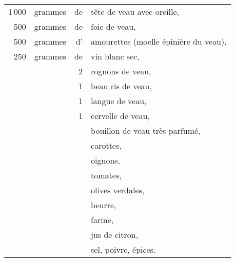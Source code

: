 \footnotesize
\begin{longtable}{rrrp{18em}}
  1 000 & grammes & de & tête de veau avec oreille,                                                       \\
    500 & grammes & de & foie de veau,                                                                    \\
    500 & grammes & d’ & amourettes (moelle épinière du veau),                                            \\
    250 & grammes & de & vin blanc sec,                                                                   \\
        &         &  2 & rognons de veau,                                                                 \\
        &         &  1 & beau ris de veau,                                                                \\
        &         &  1 & langue de veau,                                                                  \\
        &         &  1 & cervelle de veau,                                                                \\
        &         &    & bouillon de veau très parfumé,                                                   \\
        &         &    & carottes,                                                                        \\
        &         &    & oignons,                                                                         \\
        &         &    & tomates,                                                                         \\
        &         &    & olives verdales,                                                                 \\
        &         &    & beurre,                                                                          \\
        &         &    & farine,                                                                          \\
        &         &    & jus de citron,                                                                   \\
        &         &    & sel, poivre, épices.                                                             \\
\end{longtable}
\normalsize

